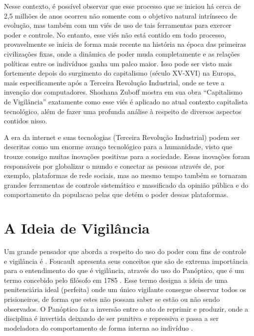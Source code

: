 \documentclass[
	12pt,
	openright,
	twoside,
	a4paper,
	english,
	french,
	spanish,
	brazil
]{abntex2}
\begin{document}
  Nesse contexto, é possível observar que esse processo que se iniciou há cerca
  de 2,5 milhões de anos ocorreu não somente com o objetivo natural intrínseco
  de evolução, mas também com um viés de uso de tais ferramentas para exercer
  poder e controle. No entanto, esse viés não está contido em todo processo,
  provavelmente se inicia de forma mais recente na história na época das
  primeiras civilizações fixas, onde a dinâmica de poder muda completamente e as
  relações políticas entre os indivíduos ganha um palco maior. Isso pode ser
  visto mais fortemente depois do surgimento do capitalismo (século XV-XVI) na
  Europa, mais especificamente após a Terceira Revolução Industrial, onde se
  teve a invenção dos computadores. Shoshana Zuboff mostra em sua obra
  ``Capitalismo de Vigilância'' exatamente como esse viés é aplicado no atual
  contexto capitalista tecnológico, além de fazer uma profunda análise à
  respeito de diversos aspectos contidos nisso.

  A era da internet e suas tecnologias (Terceira Revolução Industrial) podem ser
  descritas como um enorme avanço tecnológico para a humanidade, visto que
  trouxe consigo muitas inovações positivas para a sociedade. Essas inovações
  foram responsáveis por globalizar o mundo e conectar as pessoas através de,
  por exemplo, plataformas de rede sociais, mas ao mesmo tempo também se
  tornaram grandes ferramentas de controle sistemático e massificado da opinião
  pública e do comportamento da populacao pelas que detém o poder dessas
  plataformas.

  \chapter{A Ideia de Vigilância}

  Um grande pensador que aborda a respeito do uso do poder com fins de controle
  e vigilância é . Foucault apresenta
  seus conceitos que são de extrema importância para o entendimento do que é
  vigilância, através do uso do Panóptico, que é um termo concebido pelo
  filósofo  em 1785 \cite{bentham-panoptico}.
  Esse termo designa a ideia de uma penitenciária ideal (perfeita) onde um único
  vigilante consegue observar todos os prisioneiros, de forma que estes não
  possam saber se estão ou não sendo observados. O Panóptico faz a inversão
  entre o ato de reprimir e produzir, onde a disciplina é invertida deixando de
  ser punitiva e repressiva e passa a ser modeladora do comportamento de forma
  interna ao indivíduo \cite{trindade-foucault-panoptico}.
\end{document}
